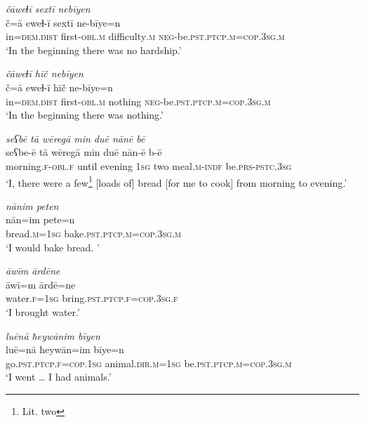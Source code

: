 \ea \label{ŽE.56}
\textit{čāweɫī sextī nebīyen} \\ 
\gll č=ā eweɫ-ī sextī ne-bīye=n \\ 
 in=\textsc{dem.dist} first\textsc{-obl}\textsc{.m} difficulty\textsc{.m} \textsc{neg-}be\textsc{.pst}\textsc{.ptcp}\textsc{.m}\textsc{=cop}\textsc{.3sg}\textsc{.m} \\ 
\glt `In the beginning there was no hardship.'
\z 
 
\ea \label{ŽE.57}
\textit{čāweɫī hīč nebīyen} \\ 
\gll č=ā eweɫ-ī hīč ne-bīye=n \\ 
 in=\textsc{dem.dist} first\textsc{-obl}\textsc{.m} nothing \textsc{neg-}be\textsc{.pst}\textsc{.ptcp}\textsc{.m}\textsc{=cop}\textsc{.3sg}\textsc{.m} \\ 
\glt `In the beginning there was nothing.'
\z 
 
\ea \label{ŽE.59}
\textit{seʕbē tā wēregā min duē nānē bē} \\ 
\gll seʕbe-ē tā wēregā min duē nān-ē b-ē \\ 
 morning\textsc{.f}\textsc{-obl}\textsc{.f} until evening \textsc{1sg} two meal\textsc{.m}\textsc{-indf} be\textsc{.prs}\textsc{-pstc}\textsc{.3sg} \\ 
\glt `I, there were a few\footnote{Lit. two} [loads of] bread [for me to cook] from morning to evening.'
\z 
 
\ea \label{ŽE.60}
\textit{nānim peten} \\ 
\gll nān=im pete=n \\ 
 bread\textsc{.m}\textsc{=\textsc{1sg}} bake\textsc{.pst}\textsc{.ptcp}\textsc{.m}\textsc{=cop}\textsc{.3sg}\textsc{.m} \\ 
\glt `I would bake bread. '
\z 
 
\ea \label{ŽE.61}
\textit{āwīm ārdēne} \\ 
\gll āwī=m ārdē=ne \\ 
 water\textsc{.f}\textsc{=\textsc{1sg}} bring\textsc{.pst}\textsc{.ptcp}\textsc{.f}\textsc{=cop}\textsc{.3sg}\textsc{.f} \\ 
\glt `I brought water.'
\z 
 
\ea \label{ŽE.62}
\textit{luēnā ħeywānim bīyen} \\ 
\gll luē=nā ħeywān=im bīye=n \\ 
 go\textsc{.pst}\textsc{.ptcp}\textsc{.f}\textsc{=cop}\textsc{.\textsc{1sg}} animal\textsc{.dir}\textsc{.m}\textsc{=\textsc{1sg}} be\textsc{.pst}\textsc{.ptcp}\textsc{.m}\textsc{=cop}\textsc{.3sg}\textsc{.m} \\ 
\glt `I went … I had animals.'
\z 
 

